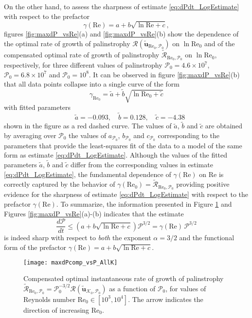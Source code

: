\documentclass[11pt]{article}
\def\P{{\mathcal{P}}}
\def\R{{\mathcal{R}}}
\def\K{{\mathcal{K}}}
\newcommand{\Reyn}{\textrm{Re}}
\newcommand{\tuvecKP}{\widetilde{\mathbf{u}}_{\K_0,\P_0}}
\newcommand{\tuvecRP}{\widetilde{\mathbf{u}}_{\Reyn_0,\P_0}}
\begin{document}
On the other hand, to assess the sharpness of estimate \eqref{eq:dPdt_LogEstimate} with respect to the prefactor 
\[
\gamma(\Reyn) = a + b\sqrt{\ln\Reyn + c},
\]
figures \ref{fig:maxdP_vsRe}(a) and \ref{fig:maxdP_vsRe}(b) show the dependence of the optimal rate of growth of palinstrophy $\R(\tuvecRP)$ on $\ln \Reyn_0$ and of the compensated optimal rate of growth of palinstrophy $\widetilde{\R}_{\Reyn_0,\P_0}$ on $\ln \Reyn_0$, respectively, for three different values of palinstrophy $\P_0 = 4.6\times10^7$, $\P_0 = 6.8\times 10^7$ and $\P_0 = 10^8$.
It can be observed in figure \ref{fig:maxdP_vsRe}(b) that all data points collapse into a single curve of the form
\begin{equation}\label{eq:Prefactor_Fitted}
\gamma_{\Reyn_0} = \tilde{a} + \tilde{b}\sqrt{ \ln\Reyn_0 + \tilde{c} }
\end{equation}
with fitted parameters
\begin{equation}
\quad \tilde{a} = -0.093, \quad \tilde{b} = 0.128, \quad \tilde{c} = -4.38
\end{equation}
shown in the figure as a red dashed curve.
The values of $\tilde{a}$, $\tilde{b}$ and $\tilde{c}$ are obtained by averaging over $\P_0$ the values of $a_{\P_0}$, $b_{\P_0}$ and $c_{\P_0}$ corresponding to the parameters that provide the least-squares fit of the data to a model of the same form as estimate \eqref{eq:dPdt_LogEstimate}.
Although the values of the fitted parameters $\tilde{a}$, $\tilde{b}$ and $\tilde{c}$ differ from the corresponding values in estimate \eqref{eq:dPdt_LogEstimate}, the fundamental dependence of $\gamma(\Reyn)$ on $\Reyn$ is correctly captured by the behavior of 
$\gamma(\Reyn_0) = \widetilde{\R}_{\Reyn_0,\P_0}$ providing positive evidence for the sharpness of estimate \eqref{eq:dPdt_LogEstimate} with respect to the prefactor $\gamma(\Reyn)$.
To summarize, the information presented in Figure \ref{fig:maxdP_vsP} and Figures \ref{fig:maxdP_vsRe}(a)-(b) indicates that the estimate
\[
\frac{d\P}{dt} \leq \left( a + b\sqrt{ \ln\Reyn +c} \right)\P^{3/2} = 
\gamma(\Reyn)\,\P^{3/2}
\]
is indeed sharp with respect to \emph{both} the exponent $\alpha = 3/2$ and the functional form of the prefactor $\gamma(\Reyn) = a + b\sqrt{\ln \Reyn + c}$.

\begin{figure}
\linespread{1.1}
\begin{center}
\texttt{[image: maxdPcomp\_vsP\_AllK]}
\caption[Optimal $d\P/dt$ vs $\P$]{
Compensated optimal instantaneous rate of growth of palinstrophy $\widetilde{\R}_{\Reyn_0,\P_0} = \P^{-3/2}_0\R(\tuvecKP)$ as a function of $\P_0$, for values of Reynolds number $\Reyn_0\in[10^3,10^4]$.  The arrow indicates the direction of increasing $\Reyn_0$. 
}
\label{fig:maxdP_vsP}
\end{center}
\end{figure}
\end{document}
